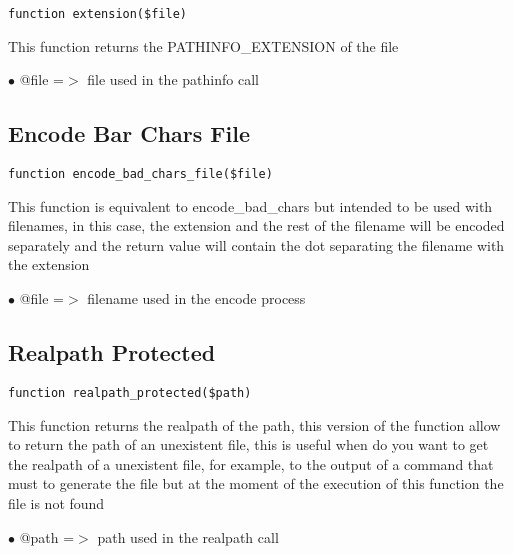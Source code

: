 \documentclass[a4paper]{book}
\begin{document}
\begin{lstlisting}
function extension($file)
\end{lstlisting}

This function returns the PATHINFO\_EXTENSION of the file

\begin{compactitem}
\item[\color{myblue}$\bullet$] @file =$>$ file used in the pathinfo call
\end{compactitem}

\hypertarget{toc127}{}
\subsection{Encode Bar Chars File}

\begin{lstlisting}
function encode_bad_chars_file($file)
\end{lstlisting}

This function is equivalent to encode\_bad\_chars but intended to be used
with filenames, in this case, the extension and the rest of the filename
will be encoded separately and the return value will contain the dot
separating the filename with the extension

\begin{compactitem}
\item[\color{myblue}$\bullet$] @file =$>$ filename used in the encode process
\end{compactitem}

\hypertarget{toc128}{}
\subsection{Realpath Protected}

\begin{lstlisting}
function realpath_protected($path)
\end{lstlisting}

This function returns the realpath of the path, this version of the function
allow to return the path of an unexistent file, this is useful when do you
want to get the realpath of a unexistent file, for example, to the output of
a command that must to generate the file but at the moment of the execution
of this function the file is not found

\begin{compactitem}
\item[\color{myblue}$\bullet$] @path =$>$ path used in the realpath call
\end{compactitem}
\end{document}
